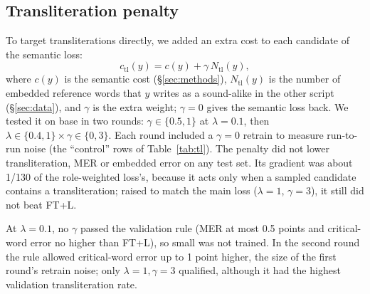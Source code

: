 \subsection{Transliteration penalty}\label{app:tl}
To target transliterations directly, we added an extra cost to each candidate of the semantic loss:
\begin{equation}
  c_{\text{tl}}(y) = c(y) + \gamma\, N_{\text{tl}}(y),
\end{equation}
where $c(y)$ is the semantic cost (\S\ref{sec:methods}), $N_{\text{tl}}(y)$ is the number of embedded reference words that $y$ writes as a sound-alike in the other script (\S\ref{sec:data}), and $\gamma$ is the extra weight; $\gamma=0$ gives the semantic loss back. We tested it on base in two rounds: $\gamma \in \{0.5, 1\}$ at $\lambda=0.1$, then $\lambda \in \{0.4, 1\} \times \gamma \in \{0, 3\}$. Each round included a $\gamma=0$ retrain to measure run-to-run noise (the ``control'' rows of Table~\ref{tab:tl}). The penalty did not lower transliteration, MER or embedded error on any test set. Its gradient was about 1/130 of the role-weighted loss's, because it acts only when a sampled candidate contains a transliteration; raised to match the main loss ($\lambda=1$, $\gamma=3$), it still did not beat FT+L.
\begin{table}[h]
\centering
\small
\setlength{\tabcolsep}{2.5pt}
\caption{Transliteration penalty on base: paired test differences vs.\ base FT+L (points; negative = better). A = ASCEND, S = NSC Same Room, D = NSC Different Room. Bold: CI excludes 0. Embedded error changes are not significant for any penalised run.}
\label{tab:tl}
\end{table}
At $\lambda=0.1$, no $\gamma$ passed the validation rule (MER at most 0.5 points and critical-word error no higher than FT+L), so small was not trained. In the second round the rule allowed critical-word error up to 1 point higher, the size of the first round's retrain noise; only $\lambda=1, \gamma=3$ qualified, although it had the highest validation transliteration rate.


